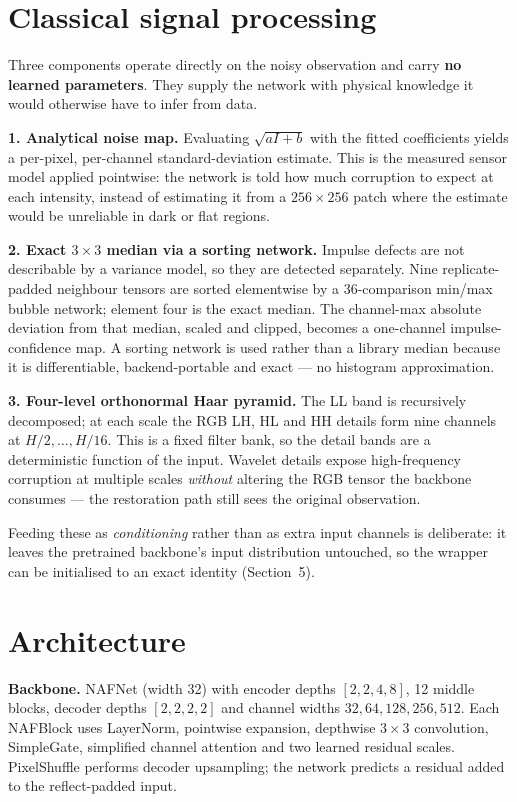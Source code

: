 \documentclass[12pt,a4paper]{article}
\begin{document}
\section{Classical signal processing}
Three components operate directly on the noisy observation and carry \textbf{no learned parameters}. They supply the network with physical knowledge it would otherwise have to infer from data.

\textbf{1. Analytical noise map.} Evaluating $\sqrt{aI+b}$ with the fitted coefficients yields a per-pixel, per-channel standard-deviation estimate. This is the measured sensor model applied pointwise: the network is told how much corruption to expect at each intensity, instead of estimating it from a $256\times256$ patch where the estimate would be unreliable in dark or flat regions.

\textbf{2. Exact $3\times3$ median via a sorting network.} Impulse defects are not describable by a variance model, so they are detected separately. Nine replicate-padded neighbour tensors are sorted elementwise by a 36-comparison min/max bubble network; element four is the exact median. The channel-max absolute deviation from that median, scaled and clipped, becomes a one-channel impulse-confidence map. A sorting network is used rather than a library median because it is differentiable, backend-portable and exact --- no histogram approximation.

\textbf{3. Four-level orthonormal Haar pyramid.} The LL band is recursively decomposed; at each scale the RGB LH, HL and HH details form nine channels at $H/2,\dots,H/16$. This is a fixed filter bank, so the detail bands are a deterministic function of the input. Wavelet details expose high-frequency corruption at multiple scales \emph{without} altering the RGB tensor the backbone consumes --- the restoration path still sees the original observation.

Feeding these as \emph{conditioning} rather than as extra input channels is deliberate: it leaves the pretrained backbone's input distribution untouched, so the wrapper can be initialised to an exact identity (Section~5).

\section{Architecture}
\textbf{Backbone.} NAFNet (width 32) with encoder depths $[2,2,4,8]$, 12 middle blocks, decoder depths $[2,2,2,2]$ and channel widths $32,64,128,256,512$. Each NAFBlock uses LayerNorm, pointwise expansion, depthwise $3\times3$ convolution, SimpleGate, simplified channel attention and two learned residual scales. PixelShuffle performs decoder upsampling; the network predicts a residual added to the reflect-padded input.
\end{document}
